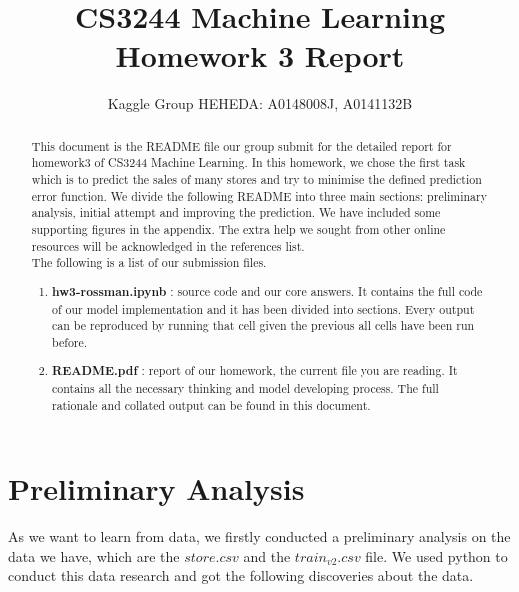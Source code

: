 \documentclass{article}
\title{CS3244 Machine Learning Homework 3 Report}
\author{Kaggle Group HEHEDA: A0148008J, A0141132B}
\begin{document}
\maketitle



\begin{abstract}
This document is the README file our group submit for the detailed report for homework3 of CS3244 Machine Learning. In this homework, we chose the first task which is to predict the sales of many stores and try to minimise the defined prediction error function. We divide the following README into three main sections: preliminary analysis, initial attempt and improving the prediction. We have included some supporting figures in the appendix. The extra help we sought from other online resources will be acknowledged in the references list.\\

The following is a list of our submission files.\\

  \begin{enumerate}
  \item \textbf{hw3-rossman.ipynb} : source code and our core answers. It contains the full code of our model implementation and it has been divided into sections. Every output can be reproduced by running that cell given the previous all cells have been run before.
  \item \textbf{README.pdf} : report of our homework, the current file you are reading. It contains all the necessary thinking and model developing process. The full rationale and collated output can be found in this document.
  \end{enumerate}
  
\end{abstract}

\newpage

\tableofcontents

\newpage

\newpage

\section{Preliminary Analysis}
As we want to learn from data, we firstly conducted a preliminary analysis on the data we have, which are the $store.csv$ and the $train_{v2}.csv$ file. We used python to conduct this data research and got the following discoveries about the data.
\end{document}
